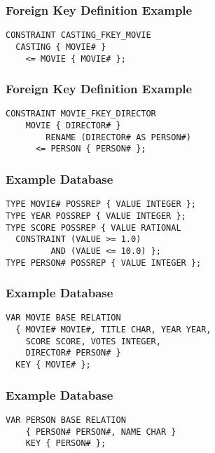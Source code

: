 \documentclass[dvipsnames]{beamer}
\theoremstyle{plain}
\begin{document}
\begin{frame}[fragile]
  \frametitle{Foreign Key Definition Example}

  \begin{example}
    \begin{lstlisting}
CONSTRAINT CASTING_FKEY_MOVIE
  CASTING { MOVIE# }
    <= MOVIE { MOVIE# };
    \end{lstlisting}
  \end{example}
\end{frame}

\begin{frame}[fragile]
  \frametitle{Foreign Key Definition Example}

  \begin{example}
    \begin{lstlisting}
CONSTRAINT MOVIE_FKEY_DIRECTOR
    MOVIE { DIRECTOR# }
        RENAME (DIRECTOR# AS PERSON#)
      <= PERSON { PERSON# };
    \end{lstlisting}
  \end{example}
\end{frame}

\begin{frame}[fragile]
  \frametitle{Example Database}

  \begin{example}[types]
    \begin{lstlisting}
TYPE MOVIE# POSSREP { VALUE INTEGER };
TYPE YEAR POSSREP { VALUE INTEGER };
TYPE SCORE POSSREP { VALUE RATIONAL
  CONSTRAINT (VALUE >= 1.0)
         AND (VALUE <= 10.0) };
TYPE PERSON# POSSREP { VALUE INTEGER };
    \end{lstlisting}
  \end{example}
\end{frame}

\begin{frame}[fragile]
  \frametitle{Example Database}

  \begin{example}
    \begin{lstlisting}
VAR MOVIE BASE RELATION
  { MOVIE# MOVIE#, TITLE CHAR, YEAR YEAR,
    SCORE SCORE, VOTES INTEGER,
    DIRECTOR# PERSON# }
  KEY { MOVIE# };
    \end{lstlisting}
  \end{example}
\end{frame}

\begin{frame}[fragile]
  \frametitle{Example Database}

  \begin{example}
    \begin{lstlisting}
VAR PERSON BASE RELATION
    { PERSON# PERSON#, NAME CHAR }
    KEY { PERSON# };
    \end{lstlisting}
  \end{example}
\end{frame}
\end{document}
